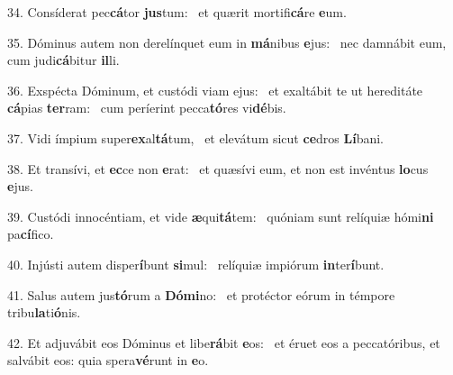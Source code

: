 34. Consíderat pec\textbf{cá}tor \textbf{jus}tum: \ast\  et quærit mortifi\textbf{cá}re \textbf{e}um.\

35. Dóminus autem non derelínquet eum in \textbf{má}nibus \textbf{e}jus: \ast\  nec damnábit eum, cum judi\textbf{cá}bitur \textbf{il}li.\

36. Exspécta Dóminum, et custódi viam ejus: \dag\  et exaltábit te ut hereditáte \textbf{cá}pias \textbf{ter}ram: \ast\  cum períerint pecca\textbf{tó}res vi\textbf{dé}bis.\

37. Vidi ímpium super\textbf{ex}al\textbf{tá}tum, \ast\  et elevátum sicut \textbf{ce}dros \textbf{Lí}bani.\

38. Et transívi, et \textbf{ec}ce non \textbf{e}rat: \ast\  et quæsívi eum, et non est invéntus \textbf{lo}cus \textbf{e}jus.\

39. Custódi innocéntiam, et vide \textbf{æ}qui\textbf{tá}tem: \ast\  quóniam sunt relíquiæ hómi\textbf{ni} pa\textbf{cí}fico.\

40. Injústi autem disper\textbf{í}bunt \textbf{si}mul: \ast\  relíquiæ impiórum \textbf{in}ter\textbf{í}bunt.\

41. Salus autem jus\textbf{tó}rum a \textbf{Dó}\textbf{mi}no: \ast\  et protéctor eórum in témpore tribu\textbf{la}ti\textbf{ó}nis.\

42. Et adjuvábit eos Dóminus et libe\textbf{rá}bit \textbf{e}os: \ast\  et éruet eos a peccatóribus, et salvábit eos: quia spera\textbf{vé}runt in \textbf{e}o.\

